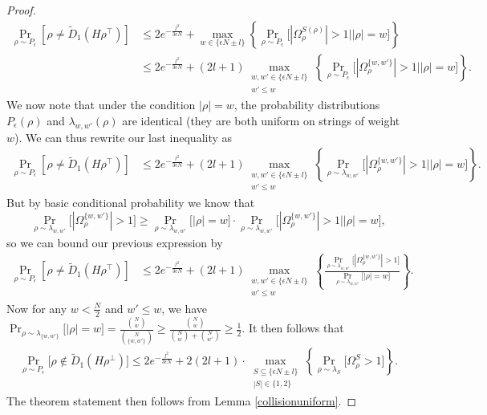 \documentclass[12pt]{article}
\begin{document}
\begin{proof}
\begin{align*}
    \Pr_{\rho\sim P_\epsilon}[ \rho\neq \tilde{D}_{1}(H\rho^\intercal)]&\leq 2e^{-\frac{l^2}{3\epsilon N}}+\max_{w\in\{\epsilon N\pm l\}}\left\{\Pr_{\rho\sim P_\epsilon}\big[ |\Omega_\rho^{S(\rho)}|>1 \big||\rho|=w \big]\right\}\\
    &\leq 2e^{-\frac{l^2}{3\epsilon N}}+(2l+1)\mathop{\max}_{\substack{w,w'\in\{\epsilon N\pm l\}\\w'\leq w}}\left\{\Pr_{\rho\sim P_\epsilon}\big[ |\Omega_\rho^{\{w,w'\}}|>1\big||\rho|=w \big]\right\}.
\end{align*}
We now note that under the condition $|\rho|=w$, the probability distributions $P_\epsilon(\rho)$ and $\lambda_{w,w'}(\rho)$ are identical (they are both uniform on strings of weight $w$). We can thus rewrite our last inequality as
\begin{align*}
    \Pr_{\rho\sim P_\epsilon}[ \rho\neq \tilde{D}_{1}(H\rho^\intercal)]    & \leq 2e^{-\frac{l^2}{3\epsilon N}}+(2l+1)\mathop{\max}_{\substack{w,w'\in\{\epsilon N\pm l\}\\w'\leq w}}\left\{\Pr_{\rho\sim \lambda_{w,w'}}\big[ |\Omega_\rho^{\{w,w'\}}|>1\big||\rho|=w \big]\right\}.
\end{align*}
But by basic conditional probability we know that
$$\Pr_{\rho\sim \lambda_{w,w'}}\big[ |\Omega_\rho^{\{w,w'\}}|>1 \big]\geq \Pr_{\rho\sim \lambda_{w,w'}}\big[ |\rho|=w \big]\cdot \Pr_{\rho\sim \lambda_{w,w'}}\big[ |\Omega_\rho^{\{w,w'\}}|>1\big||\rho|=w \big],$$
so we can bound our previous expression by
\begin{align*}
    \Pr_{\rho\sim P_\epsilon}[ \rho\neq \tilde{D}_{1}(H\rho^\intercal)]    &\leq 2e^{-\frac{l^2}{3\epsilon N}}+(2l+1)\mathop{\max}_{\substack{w,w'\in\{\epsilon N\pm l\}\\w'\leq w}}\left\{\frac{\Pr_{\rho\sim \lambda_{w,w'}}\big[ |\Omega_\rho^{\{w,w'\}}|>1 \big]}{\Pr_{\rho\sim \lambda_{w,w'}}\big[ |\rho|=w \big]}\right\}.
\end{align*}
Now for any $w<\frac{N}{2}$ and $w'\leq w$, we have $\Pr_{\rho\sim \lambda_{\{w,w'\}}}\big[ |\rho|=w \big]=\frac{\binom{N}{w}}{\binom{N}{\{w,w'\}}}\geq\frac{\binom{N}{w}}{\binom{N}{w}+\binom{N}{w'}}\geq \frac{1}{2}$. It then follows that
\begin{align*}
    \Pr_{\rho\sim P_\epsilon}\big[ \rho\notin \tilde{D}_1(H\rho^\perp) \big]\leq  2e^{-\frac{l^2}{3\epsilon N}}+      2(2l+1)\cdot \mathop{\max}_{\substack{S\subseteq \{\epsilon N\pm l\} \\
    |S|\in\{1,2\}}} \left\{\Pr_{\rho\sim \lambda_{S}}\big[\Omega_\rho^{S}>1  \big]\right\}.
\end{align*}
The theorem statement then follows from Lemma \ref{collisionuniform}.








\end{proof}
\end{document}
